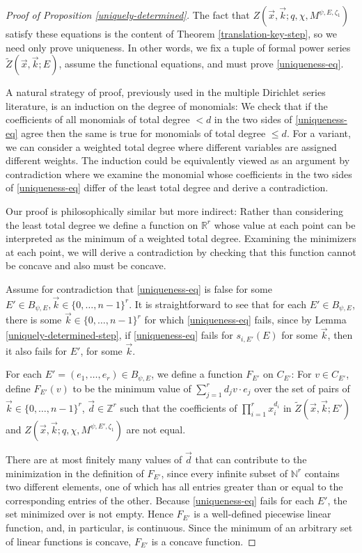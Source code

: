 \documentclass[11pt,letterpaper]{article}
\theoremstyle{definition}
\theoremstyle{remark}
\numberwithin{equation}{section}
\theoremstyle{dotless}
\newcommand{\hchi}{\psi} %
\newcommand{\gene}{\zeta_1} %
\renewcommand{\tilde}{\widetilde}
\begin{document}
\begin{proof}[Proof of Proposition \ref{uniquely-determined}] The fact that $Z(\vec{x}, \vec{k}; q, \chi, M^{\hchi,E,\gene})$ satisfy these equations is the content of Theorem \ref{translation-key-step}, so we need only prove uniqueness.  In other words, we fix a tuple of formal power series $ \tilde{Z} (\vec{x},\vec{k}; E)$, assume the functional equations, and must prove \eqref{uniqueness-eq}.

A natural strategy of proof, previously used in the multiple Dirichlet series literature, is an induction on the degree of monomials: We check that if the coefficients of all monomials of total degree $<d$ in the two sides of \eqref{uniqueness-eq} agree then the same is true for monomials of total degree $\leq d$. For a variant, we can consider a weighted total degree where different variables are assigned different weights. The induction could be equivalently viewed as an argument by contradiction where we examine the monomial whose coefficients in the two sides of \eqref{uniqueness-eq} differ of the least total degree and derive a contradiction.

Our proof is philosophically similar but more indirect: Rather than considering the least total degree we define a function on $\mathbb R^r$ whose value at each point can be interpreted as the minimum of a weighted total degree. Examining the minimizers at each point, we will derive a contradiction by checking that this function cannot be concave and also must be concave.

Assume for contradiction that \eqref{uniqueness-eq} is false for some $ E'\in B_{\hchi,E}, \vec{k} \in \{0,\dots, n-1\}^r$. It is straightforward to see that for each $E'\in B_{\hchi,E}$, there is some $\vec{k} \in \{0,\dots, n-1\}^r$ for which \eqref{uniqueness-eq} fails, since by Lemma \ref{uniquely-determined-step}, if \eqref{uniqueness-eq} fails for $s_{i,E'}(E)$ for some $\vec{k}$, then it also fails for $E'$, for some $\vec{k}$.

For each $E'=(e_1,\dots,e_r)\in B_{\hchi,E}$, we define a function $F_{E'}$ on $C_{E'}$: For $v \in C_{E'} $, define $F_{E'}(v)$ to be the minimum value of $\sum_{j=1}^r d_j  v\cdot e_j $ over the set of pairs of $\vec{k} \in \{0,\dots, n-1\}^r$, $ \vec{d} \in \mathbb Z^r$ such that the coefficients of $\prod_{i=1}^r x_i^{d_i}$ in $\tilde{Z} (\vec{x},\vec{k}; E')$ and $Z(\vec{x}, \vec{k} ;q, \chi, M^{\hchi,E',\gene}) $ are not equal. 


 There are at most finitely many values of $\vec{d}$ that can contribute to the minimization in the definition of $F_{E'}$, since every infinite subset of $\mathbb N^r$ contains two different elements, one of which has all entries greater than or equal to the corresponding entries of the other.  Because \eqref{uniqueness-eq} fails for each $E'$, the set minimized over is not empty. Hence $F_{E'}$ is a well-defined piecewise linear function, and, in particular, is continuous. Since the minimum of an arbitrary set of linear functions is concave, $F_{E'}$ is a concave function. 


\end{proof}
\end{document}
